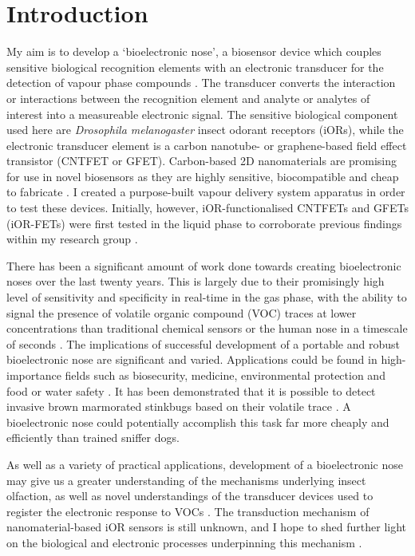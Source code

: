 \documentclass[
  a4paper,
]{scrbook}
\begin{document}
\mainmatter
{}

\hypertarget{introduction}{%
\chapter{Introduction}\label{introduction}}

My aim is to develop a `bioelectronic nose', a biosensor device which
couples sensitive biological recognition elements with an electronic
transducer for the detection of vapour phase compounds
\autocite{Lee2010,Dung2018,Moon2020}. The transducer converts the
interaction or interactions between the recognition element and analyte
or analytes of interest into a measureable electronic signal. The
sensitive biological component used here are \emph{Drosophila
melanogaster} insect odorant receptors (iORs), while the electronic
transducer element is a carbon nanotube- or graphene-based field effect
transistor (CNTFET or GFET). Carbon-based 2D nanomaterials are promising
for use in novel biosensors as they are highly sensitive, biocompatible
and cheap to fabricate \autocite{Shkodra2021}. I created a purpose-built
vapour delivery system apparatus in order to test these devices.
Initially, however, iOR-functionalised CNTFETs and GFETs (iOR-FETs) were
first tested in the liquid phase to corroborate previous findings within
my research group \autocite{Murugathas2019a,Murugathas2020}.

There has been a significant amount of work done towards creating
bioelectronic noses over the last twenty years. This is largely due to
their promisingly high level of sensitivity and specificity in real-time
in the gas phase, with the ability to signal the presence of volatile
organic compound (VOC) traces at lower concentrations than traditional
chemical sensors or the human nose in a timescale of seconds
\autocite{Lee2010,Moon2020,Terutsuki2020}. The implications of
successful development of a portable and robust bioelectronic nose are
significant and varied. Applications could be found in high-importance
fields such as biosecurity, medicine, environmental protection and food
or water safety \autocite{Dung2018,Arakawa2019,Yang2017,Son2017}. It has
been demonstrated that it is possible to detect invasive brown
marmorated stinkbugs based on their volatile trace \autocite{Moser2020}.
A bioelectronic nose could potentially accomplish this task far more
cheaply and efficiently than trained sniffer dogs.

As well as a variety of practical applications, development of a
bioelectronic nose may give us a greater understanding of the mechanisms
underlying insect olfaction, as well as novel understandings of the
transducer devices used to register the electronic response to VOCs
\autocite{Lee2010}. The transduction mechanism of nanomaterial-based iOR
sensors is still unknown, and I hope to shed further light on the
biological and electronic processes underpinning this mechanism
\autocite{Murugathas2020,Khadka2019}.
\end{document}
